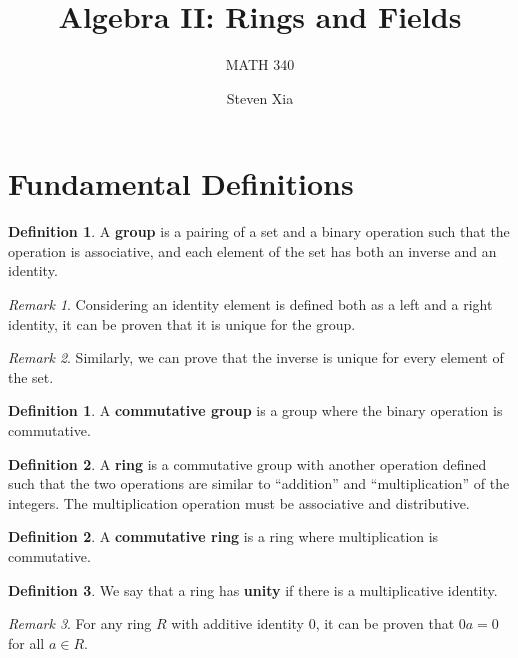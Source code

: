 \documentclass[parskip=half]{scrartcl}  %
\title{Algebra II: Rings and Fields}
\subtitle{MATH 340}
\author{Steven Xia}
\theoremstyle{definition}
\newtheorem{definition}{Definition}[section]
\newtheorem{subdefinition}{Definition}[definition]
\theoremstyle{plain}
\theoremstyle{remark}
\newtheorem{remark}{Remark}[definition]
\begin{document}
\maketitle


\section{Fundamental Definitions}


\begin{definition}
    A \textbf{group} is a pairing of a set and a binary operation such that the
    operation is associative, and each element of the set has both an inverse
    and an identity.
\end{definition}

\begin{remark}
    Considering an identity element is defined both as a left and a right
    identity, it can be proven that it is unique for the group.
\end{remark}

\begin{remark}
    Similarly, we can prove that the inverse is unique for every element of the set.
\end{remark}

\begin{subdefinition}
    A \textbf{commutative group} is a group where the binary operation is
    commutative.
\end{subdefinition}

\begin{definition}
    A \textbf{ring} is a commutative group with another operation defined such
    that the two operations are similar to ``addition'' and ``multiplication''
    of the integers.
    The multiplication operation must be associative and distributive.
\end{definition}

\begin{subdefinition}
    A \textbf{commutative ring} is a ring where multiplication is commutative.
\end{subdefinition}

\begin{subdefinition}
    We say that a ring has \textbf{unity} if there is a multiplicative identity.
\end{subdefinition}

\begin{remark}
    \label{rem:zero multiply}
    For any ring $R$ with additive identity 0, it can be proven that $0a=0$ for
    all $a\in R$.
\end{remark}
\end{document}
